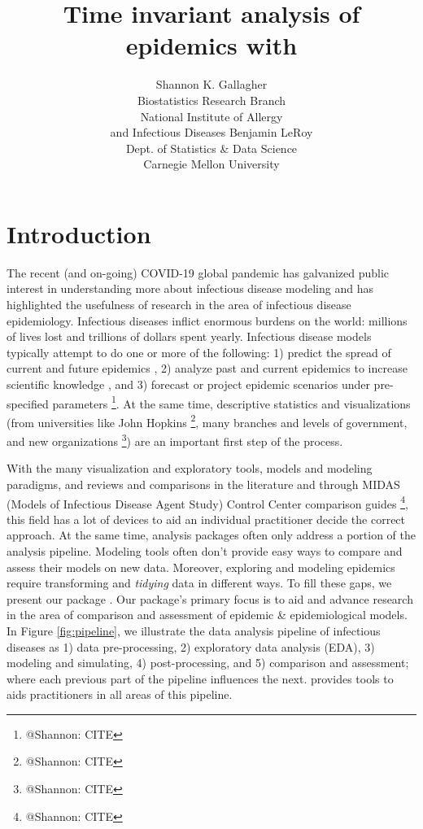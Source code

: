 \documentclass[
  shortnames]{jss}
\author{
Shannon K. Gallagher\\Biostatistics Research Branch\\
National Institute of Allergy\\
and Infectious Diseases \And Benjamin LeRoy\\Dept. of Statistics \& Data
Science\\
Carnegie Mellon University
}
\title{Time invariant analysis of epidemics with \pkg{EpiCompare}}
\begin{document}
\newcommand{\shannon}[1]{\textcolor{orange}{#1}}
\newcommand{\ben}[1]{\textcolor{violet}{#1}}

\newtheorem{theorem}{Theorem}

\section[Intro]{Introduction}\label{sec:intro}

The recent (and on-going) COVID-19 global pandemic has galvanized public
interest in understanding more about infectious disease modeling and has
highlighted the usefulness of research in the area of infectious disease
epidemiology. Infectious diseases inflict enormous burdens on the world:
millions of lives lost and trillions of dollars spent yearly. Infectious
disease models typically attempt to do one or more of the following: 1)
predict the spread of current and future epidemics
\citep[e.g. flu prediction][]{Biggerstaff2016}, 2) analyze past and
current epidemics to increase scientific knowledge
\citep[e.g. historical measle outbreaks][]{Neal2004}, and 3) forecast or
project epidemic scenarios under pre-specified parameters
\citep[e.g. ...][]{}\footnote{@Shannon: CITE}. At the same time,
descriptive statistics and visualizations (from universities like John
Hopkins \citep{}\footnote{@Shannon: CITE}, many branches and levels of
government, and new organizations \citep{}\footnote{@Shannon: CITE}) are
an important first step of the process.

With the many visualization and exploratory tools, models and modeling
paradigms, and reviews and comparisons in the literature and through
MIDAS (Models of Infectious Disease Agent Study) Control Center
comparison guides \citep{}\footnote{@Shannon: CITE}, this field has a
lot of devices to aid an individual practitioner decide the correct
approach. At the same time, analysis packages often only address a
portion of the analysis pipeline. Modeling tools often don't provide
easy ways to compare and assess their models on new data. Moreover,
exploring and modeling epidemics require transforming and
\textit{tidying} data in different ways. To fill these gaps, we present
our  package . Our package's primary focus
is to aid and advance research in the area of comparison and assessment
of epidemic \& epidemiological models. In Figure \ref{fig:pipeline}, we
illustrate the data analysis pipeline of infectious diseases as 1) data
pre-processing, 2) exploratory data analysis (EDA), 3) modeling and
simulating, 4) post-processing, and 5) comparison and assessment; where
each previous part of the pipeline influences the next. 
provides tools to aids practitioners in all areas of this pipeline.
\end{document}
